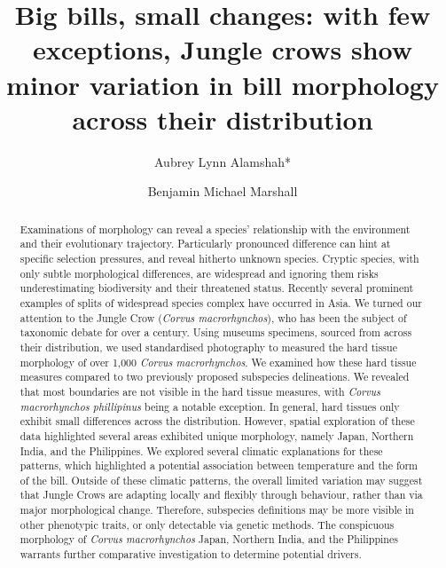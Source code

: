 \documentclass[10pt,a4paper]{article}
\begin{document}
\pagestyle{fancy}

\title{Big bills, small changes: with few exceptions, Jungle crows show minor variation in bill morphology across their distribution}
\author[1]{Aubrey Lynn Alamshah*}
\author[2]{Benjamin Michael Marshall}

\maketitle
\thispagestyle{fancy}

\begin{abstract}

Examinations of morphology can reveal a species' relationship with the environment and their evolutionary trajectory. Particularly pronounced difference can hint at specific selection pressures, and reveal hitherto unknown species. Cryptic species, with only subtle morphological differences, are widespread and ignoring them risks underestimating biodiversity and their threatened status. Recently several prominent examples of splits of widespread species complex have occurred in Asia. We turned our attention to the Jungle Crow (\emph{Corvus macrorhynchos}), who has been the subject of taxonomic debate for over a century. Using museums specimens, sourced from across their distribution, we used standardised photography to measured the hard tissue morphology of over 1,000 \emph{Corvus macrorhynchos}. We examined how these hard tissue measures compared to two previously proposed subspecies delineations. We revealed that most boundaries are not visible in the hard tissue measures, with \emph{Corvus macrorhynchos phillipinus} being a notable exception. In general, hard tissues only exhibit small differences across the distribution. However, spatial exploration of these data highlighted several areas exhibited unique morphology, namely Japan, Northern India, and the Philippines. We explored several climatic explanations for these patterns, which highlighted a potential association between temperature and the form of the bill. Outside of these climatic patterns, the overall limited variation may suggest that Jungle Crows are adapting locally and flexibly through behaviour, rather than via major morphological change. Therefore, subspecies definitions may be more visible in other phenotypic traits, or only detectable via genetic methods. The conspicuous morphology of \emph{Corvus macrorhynchos} Japan, Northern India, and the Philippines warrants further comparative investigation to determine potential drivers.

\end{abstract}
\end{document}
